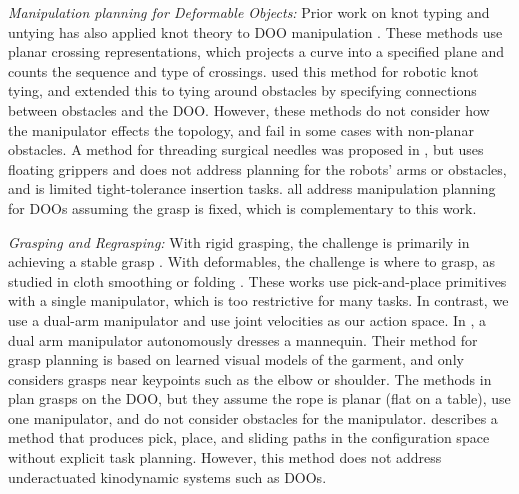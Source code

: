\textit{Manipulation planning for Deformable Objects:}
Prior work on knot typing and untying has also applied knot theory to DOO manipulation \cite{WakamatsuKnots2005, Wakamatsu2006Untangling, Saha07, WeifuKnots, UntanglingHulk, Sundaresan2020, UntanglingFull}. These methods use planar crossing representations, which projects a curve into a specified plane and counts the sequence and type of crossings. \cite{Saha07} used this method for robotic knot tying, and extended this to tying around obstacles by specifying connections between obstacles and the DOO. However, these methods do not consider how the manipulator effects the topology, and fail in some cases with non-planar obstacles. A method for threading surgical needles was proposed in \cite{Weifu}, but uses floating grippers and does not address planning for the robots' arms or obstacles, and is limited tight-tolerance insertion tasks. \cite{TetheredToolManipulation, UnreliableDale2019, OnlineOffline22, Smolentsev2023ShapeVS, YuZL22, GlobalAdapt22}  all address manipulation planning for DOOs assuming the grasp is fixed, which is complementary to this work.

\textit{Grasping and Regrasping:}
With rigid grasping, the challenge is primarily in achieving a stable grasp \cite{DexNet1,DexNet2}. With deformables, the challenge is where to grasp, as studied in cloth smoothing or folding \cite{HoqueCloth2020,ZixuanCloth21,ClothSmoothingWu}. These works use pick-and-place primitives with a single manipulator, which is too restrictive for many tasks. In contrast, we use a dual-arm manipulator and use joint velocities as our action space. In \cite{Zhang2022}, a dual arm manipulator autonomously dresses a mannequin. Their method for grasp planning is based on learned visual models of the garment, and only considers grasps near keypoints such as the elbow or shoulder. The methods in \cite{RitaCableRouting,Nair2017,CFM} plan grasps on the DOO, but they assume the rope is planar (flat on a table), use one manipulator, and do not consider obstacles for the manipulator. \cite{Simeon04} describes a method that produces pick, place, and sliding paths in the configuration space without explicit task planning. However, this method does not address underactuated kinodynamic systems such as DOOs.
